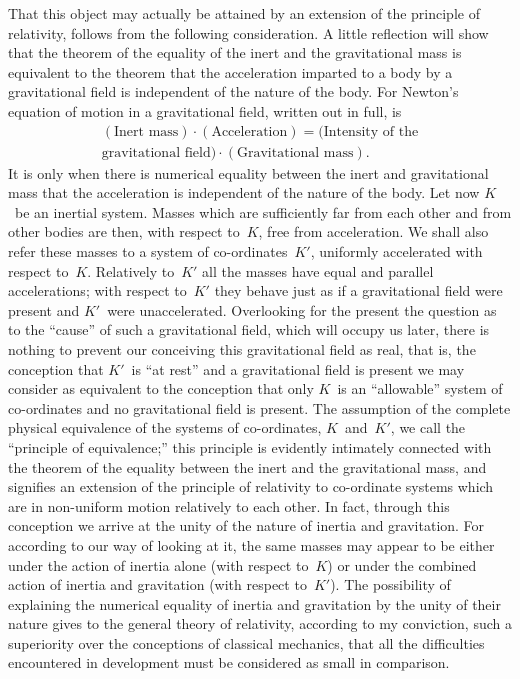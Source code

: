 \documentclass[12pt]{book}[2005/09/16]
\newcommand{\PageSep}[1]{\ignorespaces}
\begin{document}
That this object may actually be attained by an extension
of the principle of relativity, follows from the following
consideration. A little reflection will show that the
theorem of the equality of the inert and the gravitational
mass is equivalent to the theorem that the acceleration
imparted to a body by a gravitational field is independent
of the nature of the body. For Newton's equation of
motion in a gravitational field, written out in full, is
\begin{multline*}
(\text{Inert mass})·(\text{Acceleration}) = (\text{Intensity of the} \\
  \text{gravitational field})·(\text{Gravitational mass}).
\end{multline*}
It is only when there is numerical equality between the
inert and gravitational mass that the acceleration is independent
of the nature of the body. Let now $K$~be an
inertial system. Masses which are sufficiently far from
each other and from other bodies are then, with respect
to~$K$, free from acceleration. We shall also refer these
masses to a system of co-ordinates~$K'$, uniformly accelerated
with respect to~$K$. Relatively to~$K'$ all the masses
have equal and parallel accelerations; with respect to~$K'$
they behave just as if a gravitational field were present and
\PageSep{64}
$K'$~were unaccelerated. Overlooking for the present the
question as to the ``cause'' of such a gravitational field,
which will occupy us later, there is nothing to prevent
our conceiving this gravitational field as real, that is, the
conception that $K'$~is ``at rest'' and a gravitational field
is present we may consider as equivalent to the conception
that only $K$~is an ``allowable'' system of co-ordinates
and no gravitational field is present. The assumption of
the complete physical equivalence of the systems of co-ordinates,
$K$~and~$K'$, we call the ``principle of equivalence;''
%
this principle is evidently intimately connected
with the theorem of the equality between the inert and
the gravitational mass, and signifies an extension of the
principle of relativity to co-ordinate systems which are
in non-uniform motion relatively to each other. In fact,
through this conception we arrive at the unity of the
nature of inertia and gravitation. For according to our
way of looking at it, the same masses may appear to be
either under the action of inertia alone (with respect to~$K$)
or under the combined action of inertia and gravitation
(with respect to~$K'$). The possibility of explaining
the numerical equality of inertia and gravitation by the
unity of their nature gives to the general theory of
relativity, according to my conviction, such a superiority
over the conceptions of classical mechanics, that all the
difficulties encountered in development must be considered
as small in comparison.
\end{document}
